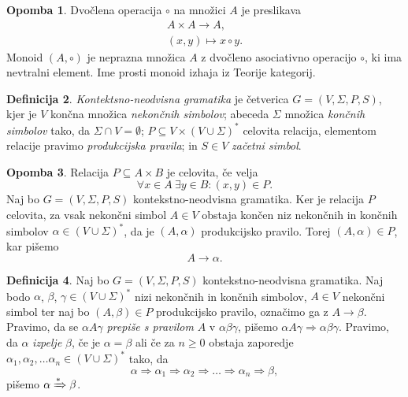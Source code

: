 \documentclass{amsart}
\theoremstyle{definition}
\newtheorem{definicija}{Definicija}[section]
\newtheorem{opomba}[definicija]{Opomba}
\theoremstyle{plain} %
\begin{document}
\begin{opomba}
    
    Dvočlena operacija $ \circ $ na množici $ A $ je preslikava
    \begin{gather*}
        A \times A \rightarrow A, \\
        (x,y) \mapsto x \circ y.
    \end{gather*}
    Monoid $ (A, \circ) $ je neprazna množica $ A $ z dvočleno asociativno operacijo $ \circ $,
    ki ima nevtralni element. Ime prosti monoid izhaja iz Teorije kategorij.

\end{opomba}

\begin{definicija}

    \textit{Kontektsno-neodvisna gramatika} je četverica $ G = ( V, \Sigma, P, S ) $, kjer je
    $ V $ končna množica \textit{nekončnih simbolov}; abeceda $ \Sigma $ množica \textit{končnih simbolov}
    tako, da $ \Sigma \cap V = \emptyset $; $ P \subseteq V \times ( V \cup \Sigma )^* $ celovita relacija,
    elementom relacije pravimo \textit{produkcijska pravila}; in $ S \in V $ \textit{začetni simbol}.

\end{definicija}

\begin{opomba}
    
    Relacija $ P \subseteq A \times B $ je celovita, če velja
    \[
        \forall x \in A \ \exists y \in B \colon (x,y) \in P.
    \]
    Naj bo $ G = ( V, \Sigma, P, S ) $ kontekstno-neodvisna gramatika. Ker je relacija $ P $ celovita,
    za vsak nekončni simbol $ A \in V $ obstaja končen niz nekončnih in končnih simbolov $ \alpha \in 
    ( V \cup \Sigma )^* $, da je $ (A, \alpha) $ produkcijsko pravilo. Torej $ (A, \alpha) \in P $, kar pišemo
    \[
        A \rightarrow \alpha.
    \]

\end{opomba}

\begin{definicija}
    
    Naj bo $ G = ( V, \Sigma, P, S ) $ kontekstno-neodvisna gramatika. Naj bodo $ \alpha $,
    $ \beta $, $ \gamma \in ( V \cup \Sigma )^* $ nizi nekončnih in končnih simbolov,
    $ A \in V $ nekončni simbol ter naj bo $ ( A, \beta ) \in P $ produkcijsko pravilo,
    označimo ga z $ A \rightarrow \beta $. Pravimo, da se $ \alpha A \gamma $ 
    \textit{prepiše s pravilom} $ A $ v $ \alpha\beta\gamma $, pišemo $ \alpha A \gamma  \Rightarrow 
    \alpha\beta\gamma $. Pravimo, da $ \alpha $ \textit{izpelje} $ \beta $, če je $ \alpha = \beta $ ali če
    za $ n \geq 0 $ obstaja zaporedje $ \alpha_1, \alpha_2, \ldots \alpha_n
    \in ( V \cup \Sigma )^* $ tako, da 
    \[
        \alpha \Rightarrow \alpha_1 \Rightarrow \alpha_2 \Rightarrow \ldots \Rightarrow \alpha_n
        \Rightarrow \beta,
    \]
    pišemo $ \alpha \xRightarrow{*} \beta $.

\end{definicija}
\end{document}
